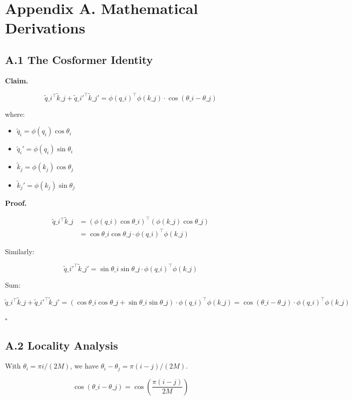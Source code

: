 
\section{Appendix A. Mathematical Derivations}

\subsection{A.1 The Cosformer Identity}

\textbf{Claim.}

\[
\tilde{q}\_i^\top \tilde{k}\_j + \tilde{q}\_i'^\top \tilde{k}\_j' = \phi(q\_i)^\top \phi(k\_j) \cdot \cos(\theta\_i - \theta\_j)
\]

where:
\begin{itemize}
\item $\tilde{q}_i = \phi(q_i) \cos\theta_i$
\item $\tilde{q}_i' = \phi(q_i) \sin\theta_i$
\item $\tilde{k}_j = \phi(k_j) \cos\theta_j$
\item $\tilde{k}_j' = \phi(k_j) \sin\theta_j$

\end{itemize}
\textbf{Proof.}

\[
\begin{aligned}
\tilde{q}\_i^\top \tilde{k}\_j &= (\phi(q\_i) \cos\theta\_i)^\top (\phi(k\_j) \cos\theta\_j) \\
&= \cos\theta\_i \cos\theta\_j \cdot \phi(q\_i)^\top \phi(k\_j)
\end{aligned}
\]

Similarly:

\[
\tilde{q}\_i'^\top \tilde{k}\_j' = \sin\theta\_i \sin\theta\_j \cdot \phi(q\_i)^\top \phi(k\_j)
\]

Sum:

\[
\tilde{q}\_i^\top \tilde{k}\_j + \tilde{q}\_i'^\top \tilde{k}\_j' = (\cos\theta\_i \cos\theta\_j + \sin\theta\_i \sin\theta\_j) \cdot \phi(q\_i)^\top \phi(k\_j) = \cos(\theta\_i - \theta\_j) \cdot \phi(q\_i)^\top \phi(k\_j)
\]

$\square$

\subsection{A.2 Locality Analysis}

With $\theta_i = \pi i / (2 M)$, we have $\theta_i - \theta_j = \pi (i - j) / (2 M)$.

\[
\cos(\theta\_i - \theta\_j) = \cos\!\left(\frac{\pi (i-j)}{2M}\right)
\]

